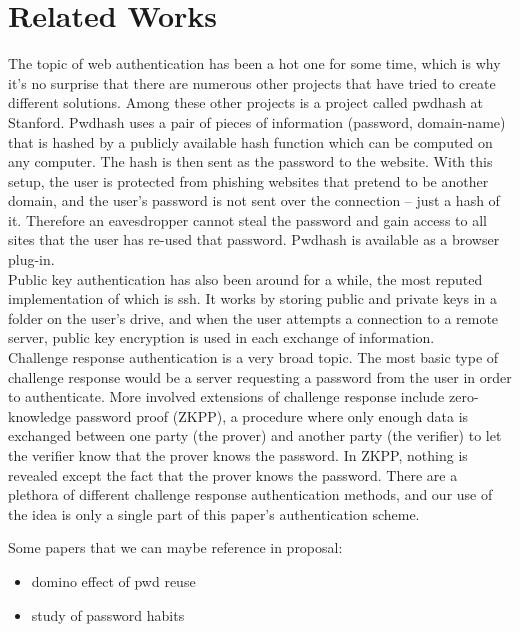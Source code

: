 \documentclass[11pt]{article}   %
\begin{document}
\section{Related Works} \label{sec:relate}
The topic of web authentication has been a hot one for some time, which is why it's no surprise that there are numerous other projects that have tried to create different solutions.  Among these other projects is a project called pwdhash at Stanford.  Pwdhash uses a pair of pieces of information (password, domain-name) that is hashed by a publicly available hash function which can be computed on any computer.  The hash is then sent as the password to the website.  With this setup, the user is protected from phishing websites that pretend to be another domain, and the user's password is not sent over the connection – just a hash of it.  Therefore an eavesdropper cannot steal the password and gain access to all sites that the user has re-used that password.  Pwdhash is available as a browser plug-in.\\
Public key authentication has also been around for a while, the most reputed implementation of which is ssh.  It works by storing public and private keys in a folder on the user's drive, and when the user attempts a connection to a remote server, public key encryption is used in each exchange of information.\\
Challenge response authentication is a very broad topic.  The most basic type of challenge response would be a server requesting a password from the user in order to authenticate.  More involved extensions of challenge response include zero-knowledge password proof (ZKPP), a procedure where only enough data is exchanged between one party (the prover) and another party (the verifier) to let the verifier know that the prover knows the password.  In ZKPP, nothing is revealed except the fact that the prover knows the password.  There are a plethora of different challenge response authentication methods, and our use of the idea is only a single part of this paper's authentication scheme.

Some papers that we can maybe reference in proposal:
\begin{itemize}
\item domino effect of pwd reuse \cite{domino}
\item study of password habits \cite{habits}
\end{itemize}


{}
\end{document}
